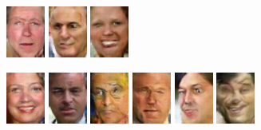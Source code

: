 \begin{figure}[!h]
{        \includegraphics[scale=1]{figures/lfw/appendix3/lfw64x48color_image0069.png}
        \includegraphics[scale=1]{figures/lfw/appendix3/lfw64x48color_image0070.png}
        \includegraphics[scale=1]{figures/lfw/appendix3/lfw64x48color_image0071.png}
    }
    \vspace{0.1cm}
    \centerline{
        \includegraphics[scale=1]{figures/lfw/appendix3/lfw64x48color_image0072.png}
        \includegraphics[scale=1]{figures/lfw/appendix3/lfw64x48color_image0073.png}
        \includegraphics[scale=1]{figures/lfw/appendix3/lfw64x48color_image0074.png}
        \includegraphics[scale=1]{figures/lfw/appendix3/lfw64x48color_image0075.png}
        \includegraphics[scale=1]{figures/lfw/appendix3/lfw64x48color_image0076.png}
        \includegraphics[scale=1]{figures/lfw/appendix3/lfw64x48color_image0077.png}
}
\end{figure}
